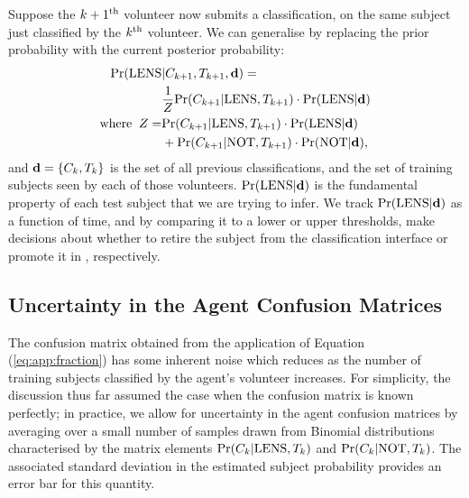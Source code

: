 \documentclass[useAMS,usenatbib,a4paper]{mn2e}
\begin{document}
Suppose the $k+1^{\rm th}$ volunteer now submits a classification, on the same
subject just classified by the $k^{\rm th}$ volunteer. We can generalise
 by replacing the prior probability with the current
posterior probability:
\begin{align}
  \label{eq:app:update}
  {\rm Pr}({\rm LENS} & |C_{k+1},T_{k+1},{\mathbf{d}}) = \\
  & \frac{1}{Z} {\rm Pr}(C_{k+1}|{\rm LENS},T_{k+1}) \cdot {\rm Pr}({\rm LENS}|{\mathbf{d}}) \\ \notag
{\rm where}\;\; Z = & {\rm Pr}(C_{k+1}|{\rm LENS},T_{k+1})\cdot{\rm Pr}({\rm LENS}|{\mathbf{d}}) \\ \notag
      & + {\rm Pr}(C_{k+1}|{\rm NOT},T_{k+1})\cdot{\rm Pr}({\rm NOT}|{\mathbf{d}}), \notag
\end{align}
and ${\mathbf{d}} = \{C_k,T_k\}$ is the set of all previous
classifications, and the set of training subjects seen by each of those
volunteers.
${\rm Pr}({\rm LENS}|{\mathbf{d}})$ is the fundamental property of each test subject that
we are trying to infer. We track ${\rm Pr}({\rm LENS}|{\mathbf{d}})$ as a function of time,
and by comparing it to a lower or upper thresholds, make decisions about
whether to retire the subject from the classification interface or
promote it in \Talk, respectively.


\subsection{Uncertainty in the Agent Confusion Matrices}
\label{appendix:swap:uncertainty}

The confusion matrix obtained from the application of Equation
(\ref{eq:app:fraction}) has some inherent noise which reduces as the number of
training subjects classified by the agent's volunteer increases. For
simplicity, the discussion thus far assumed the case when the confusion matrix
is known perfectly; in practice, we allow for uncertainty in the agent
confusion matrices by averaging over a small number of samples drawn from
Binomial distributions characterised by the matrix elements
${\rm Pr}(C_k|{\rm LENS},T_k)$ and  ${\rm Pr}(C_k|{\rm NOT},T_k)$. The associated standard
deviation in the estimated subject probability provides an error bar for this
quantity.

% 
\end{document}
